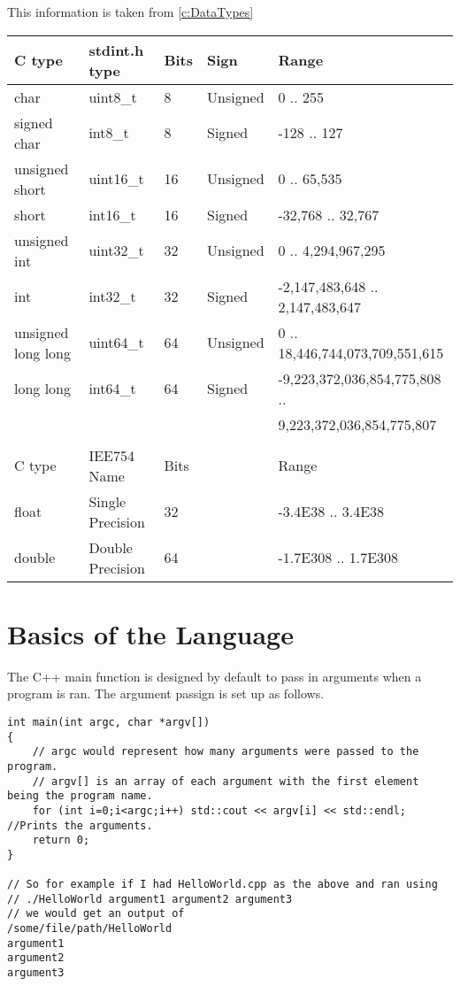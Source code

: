 \begin{fancybox}{}	
	This information is taken from \ref{c:DataTypes}
	\begin{center}
		\begin{tabular}{l|l|l|l|l}
			C type & stdint.h type & Bits & Sign & Range\\
			\hline
			char & uint8\_t & 8 & Unsigned & 0 .. 255 \\
			signed char & int8\_t & 8 & Signed & -128 .. 127 \\
			unsigned short & uint16\_t & 16 & Unsigned & 0 .. 65,535 \\
			short & int16\_t & 16 & Signed & -32,768 .. 32,767 \\
			unsigned int & uint32\_t & 32 & Unsigned & 0 .. 4,294,967,295 \\
			int & int32\_t & 32 & Signed & -2,147,483,648 .. 2,147,483,647 \\
			unsigned long long & uint64\_t & 64 & Unsigned & 0 .. 18,446,744,073,709,551,615 \\
			long long & int64\_t & 64 & Signed & -9,223,372,036,854,775,808 .. \\ & & & & \hspace{2em} 9,223,372,036,854,775,807 \\
			& & & & \\
			C type & IEE754 Name & Bits & & Range \\
			\hline
			float & Single Precision & 32 & & -3.4E38 .. 3.4E38 \\
			double & Double Precision & 64 & & -1.7E308 .. 1.7E308
		\end{tabular}
	\end{center}
\end{fancybox}




\section{Basics of the Language}

The C++ main function is designed by default to pass in arguments when a program is ran. The argument passign is set up as follows.
\begin{lstlisting}
int main(int argc, char *argv[])
{
	// argc would represent how many arguments were passed to the program.
	// argv[] is an array of each argument with the first element being the program name.
	for (int i=0;i<argc;i++) std::cout << argv[i] << std::endl; //Prints the arguments.
	return 0;
}

// So for example if I had HelloWorld.cpp as the above and ran using
// ./HelloWorld argument1 argument2 argument3
// we would get an output of 
/some/file/path/HelloWorld
argument1
argument2
argument3
\end{lstlisting}

